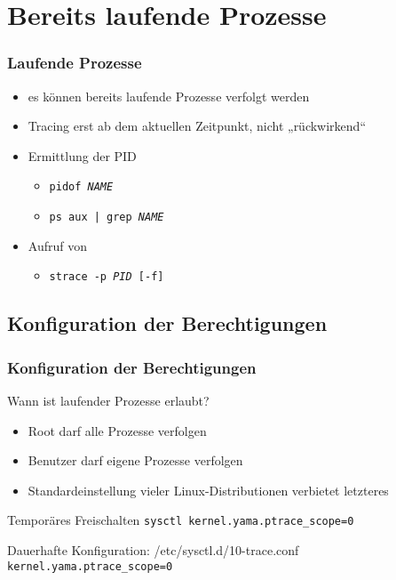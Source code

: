\section{Bereits laufende Prozesse}


\begin{frame}
  \frametitle{Laufende Prozesse}

  \begin{itemize}
    \item es können bereits laufende Prozesse verfolgt werden
    \item Tracing erst ab dem aktuellen Zeitpunkt, nicht „rückwirkend“
    \item Ermittlung der PID
      \begin{itemize}
        \item \texttt{pidof \emph{NAME}}
        \item \texttt{ps aux | grep \emph{NAME}}
      \end{itemize}
    \item Aufruf von \strace{}
      \begin{itemize}
        \item \texttt{strace -p \emph{PID} [-f]}
      \end{itemize}
  \end{itemize}
\end{frame}

\subsection{Konfiguration der Berechtigungen}

\begin{frame}[fragile]
  \frametitle{Konfiguration der Berechtigungen}

  \begin{block}{Wann ist \strace{} laufender Prozesse erlaubt?}
    \begin{itemize}
      \item Root darf alle Prozesse verfolgen
      \item Benutzer darf eigene Prozesse verfolgen
      \item Standardeinstellung vieler Linux-Distributionen verbietet letzteres
    \end{itemize}
  \end{block}

  \pause

  \begin{block}{Temporäres Freischalten}
    \texttt{sysctl kernel.yama.ptrace\_scope=0}
  \end{block}

  \begin{exampleblock}{Dauerhafte Konfiguration: /etc/sysctl.d/10-trace.conf}
    \texttt{kernel.yama.ptrace\_scope=0}
  \end{exampleblock}

\end{frame}

